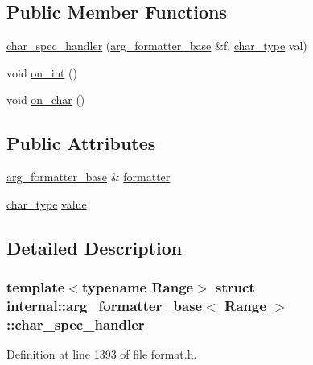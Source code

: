 \subsection*{Public Member Functions}
\begin{DoxyCompactItemize}
\item 
\hyperlink{structinternal_1_1arg__formatter__base_1_1char__spec__handler_ad6de9cee9d354a7f9dbe8d8b29d7041d}{char\+\_\+spec\+\_\+handler} (\hyperlink{classinternal_1_1arg__formatter__base}{arg\+\_\+formatter\+\_\+base} \&f, \hyperlink{classinternal_1_1arg__formatter__base_a407930bf282880d2ca45dfa8f5d2034b}{char\+\_\+type} val)
\item 
void \hyperlink{structinternal_1_1arg__formatter__base_1_1char__spec__handler_a97c9496a1f9dd832fdcd383fe075804a}{on\+\_\+int} ()
\item 
void \hyperlink{structinternal_1_1arg__formatter__base_1_1char__spec__handler_ae850263856669770f072d561e53fcb45}{on\+\_\+char} ()
\end{DoxyCompactItemize}
\subsection*{Public Attributes}
\begin{DoxyCompactItemize}
\item 
\hyperlink{classinternal_1_1arg__formatter__base}{arg\+\_\+formatter\+\_\+base} \& \hyperlink{structinternal_1_1arg__formatter__base_1_1char__spec__handler_a85cadff96682e7cd84e67d9282bb20b5}{formatter}
\item 
\hyperlink{classinternal_1_1arg__formatter__base_a407930bf282880d2ca45dfa8f5d2034b}{char\+\_\+type} \hyperlink{structinternal_1_1arg__formatter__base_1_1char__spec__handler_a8cfc2ca86ce48c41abf2491020fb08cb}{value}
\end{DoxyCompactItemize}


\subsection{Detailed Description}
\subsubsection*{template$<$typename Range$>$\newline
struct internal\+::arg\+\_\+formatter\+\_\+base$<$ Range $>$\+::char\+\_\+spec\+\_\+handler}



Definition at line 1393 of file format.\+h.



